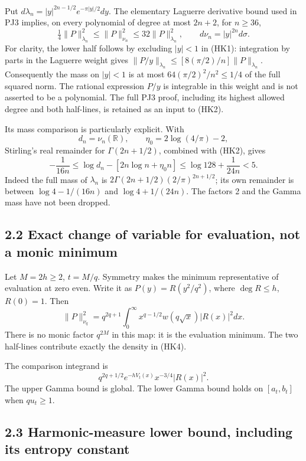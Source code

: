 \documentclass[10pt]{article}
\begin{document}
Put \(d\lambda_n=|y|^{2n-1/2}e^{-\pi|y|/2}dy\). The elementary Laguerre derivative bound used in PJ3 implies, on every polynomial of degree at most \(2n+2\), for \(n\ge36\), \[
 \tfrac14\|P\|_{\lambda_n}^2
 \le\|P\|_{\nu_n}^2\le32\|P\|_{\lambda_n}^2,
 \qquad d\nu_n=|y|^{2n}d\sigma.
 \tag{HK2}
\] For clarity, the lower half follows by excluding \(|y|<1\) in (HK1): integration by parts in the Laguerre weight gives \(\|P/y\|_{\lambda_n}\le[8(\pi/2)/n]\|P\|_{\lambda_n}\). Consequently the mass on \(|y|<1\) is at most \(64(\pi/2)^2/n^2\le1/4\) of the full squared norm. The rational expression \(P/y\) is integrable in this weight and is not asserted to be a polynomial. The full PJ3 proof, including its highest allowed degree and both half-lines, is retained as an input to (HK2).

Its mass comparison is particularly explicit. With \[d_n=\nu_n(\mathbb R),\qquad \eta_0=2\log(4/\pi)-2,\] Stirling's real remainder for \(\Gamma(2n+1/2)\), combined with (HK2), gives \[
 \boxed{-\frac1{16n}\le
 \log d_n-[2n\log n+\eta_0n]
 \le\log128+\frac1{24n}<5.}
 \tag{HK3}
\] Indeed the full mass of \(\lambda_n\) is \(2\Gamma(2n+1/2)(2/\pi)^{2n+1/2}\); its own remainder is between \(\log4-1/(16n)\) and \(\log4+1/(24n)\). The factors 2 and the Gamma mass have not been dropped.

\subsection{2.2 Exact change of variable for evaluation, not a monic minimum}\label{exact-change-of-variable-for-evaluation-not-a-monic-minimum}

Let \(M=2h\ge2\), \(t=M/q\). Symmetry makes the minimum representative of evaluation at zero even. Write it as \(P(y)=R(y^2/q^2)\), where \(\deg R\le h\), \(R(0)=1\). Then \[
 \boxed{\|P\|_{\nu_q}^2
 =q^{2q+1}\int_0^\infty
 x^{q-1/2}w(q\sqrt x)|R(x)|^2dx.}
 \tag{HK4}
\] There is no monic factor \(q^{2M}\) in this map: it is the evaluation minimum. The two half-lines contribute exactly the density in (HK4).

The comparison integrand is \[
 q^{2q+1/2}e^{-hV_t(x)}x^{-3/4}|R(x)|^2.
\] The upper Gamma bound is global. The lower Gamma bound holds on \([a_t,b_t]\) when \(q u_t\ge1\).

\subsection{2.3 Harmonic-measure lower bound, including its entropy constant}\label{harmonic-measure-lower-bound-including-its-entropy-constant}
\end{document}
